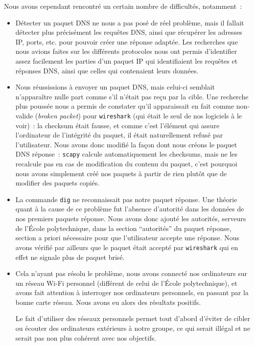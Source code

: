 \documentclass[a4paper, 12pt,twoside]{article}
\begin{document}
    \noindent Nous avons cependant rencontré un certain nombre de difficultés, notamment~:
    \begin{itemize}[label=\color{bleu303}\textbullet{}]
        \item Détecter un paquet DNS ne nous a pas posé de réel problème, mais il fallait détecter plus précisément les requêtes DNS, ainsi que récupérer les adresses IP, ports, etc. pour pouvoir créer une réponse adaptée. Les recherches que nous avions faites sur les différents protocoles nous ont permis d'identifier assez facilement les parties d'un paquet IP qui identifiaient les requêtes et réponses DNS, ainsi que celles qui contenaient leurs données.
        \item Nous réussissions à envoyer un paquet DNS, mais celui-ci semblait n'apparaître nulle part comme s'il n'était pas reçu par la cible. Une recherche plus poussée nous a permis de constater qu'il apparaissait en fait comme non-valide (\emph{broken packet}) pour \verb!wireshark! (qui était le seul de nos logiciels à le voir)~: la checksum était fausse, et comme c'est l'élément qui assure l'ordinateur de l'intégrité du paquet, il était naturellement refusé par l'utilisateur. Nous avons donc modifié la façon dont nous créons le paquet DNS réponse~: \verb!scapy! calcule automatiquement les checksums, mais ne les recalcule pas en cas de modification du contenu du paquet, c'est pourquoi nous avons simplement créé nos paquets à partir de rien plutôt que de modifier des paquets copiés.
        \item La commande \verb!dig! ne reconnaissait pas notre paquet réponse. Une théorie quant à la cause de ce problème fut l'absence d'autorité dans les données de nos premiers paquets réponse. Nous avons donc ajouté les autorités, serveurs de l'École polytechnique, dans la section “autorités” du paquet réponse, section a priori nécessaire pour que l'utilisateur accepte une réponse. Nous avons vérifié par ailleurs que le paquet était accepté par \verb!wireshark! qui en effet ne signale plus de paquet brisé.
        \item Cela n'ayant pas résolu le problème, nous avons connecté nos ordinateurs sur un réseau Wi-Fi personnel (différent de celui de l'École polytechnique), et avons fait attention à interroger nos ordinateurs personnels, en passant par la bonne carte réseau. Nous avons eu alors des résultats positifs.

        Le fait d'utiliser des réseaux personnels permet tout d'abord d'éviter de cibler ou écouter des ordinateurs extérieurs à notre groupe, ce qui serait illégal et ne serait pas non plus cohérent avec nos objectifs.


\end{itemize}
\end{document}
